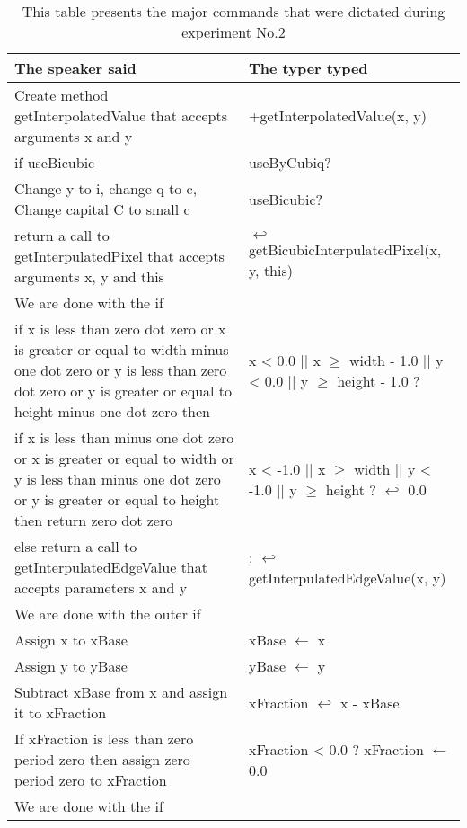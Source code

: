 \begin{table}[H]
	\begin{tabular}{|p{10cm}|p{6cm}|}
		\hline
		\rowcolor[HTML]{9B9B9B} 
		{\color[HTML]{000000} The speaker said} & {\color[HTML]{000000} The typer typed} \\ \hline
		Create method getInterpolatedValue that accepts arguments x and y & +getInterpolatedValue(x, y) \\ \hline
		if useBicubic & useByCubiq? \\ \hline
		Change y to i, change q to c, Change capital C to small c & useBicubic? \\ \hline
		return a call to getInterpulatedPixel that accepts arguments x, y and this & $\hookleftarrow$ getBicubicInterpulatedPixel(x, y, this) \\ \hline
		We are done with the if & \\ \hline
		if x is less than zero dot zero or x is greater or equal to width minus one dot zero or y is less than zero dot zero or y is greater or equal to height minus one dot zero then & x < 0.0 || x $\geq$ width - 1.0 || y < 0.0 || y $\geq$ height - 1.0 ? \\ \hline
		if x is less than minus one dot zero or x is greater or equal to width or y is less than minus one dot zero or y is greater or equal to height then return zero dot zero & x < -1.0 || x $\geq$ width || y < -1.0 || y $\geq$ height ?  $\hookleftarrow$ 0.0 \\ \hline
		else return a call to getInterpulatedEdgeValue that accepts parameters x and y & : $\hookleftarrow$ getInterpulatedEdgeValue(x, y) \\ \hline
		We are done with the outer if &  \\ \hline
		Assign x to xBase & xBase $\leftarrow$ x \\ \hline
		Assign y to yBase & yBase $\leftarrow$ y \\ \hline 
		Subtract xBase from x and assign it to xFraction & xFraction $\hookleftarrow$ x - xBase \\ \hline
		If xFraction is less than zero period zero then assign zero period zero to xFraction & xFraction < 0.0 ? xFraction $\leftarrow$ 0.0\\ \hline
		We are done with the if  &  \\ \hline 
	\end{tabular}
	\caption{This table presents the major commands that were dictated during experiment No.2}
	\label{tab2}
\end{table}
